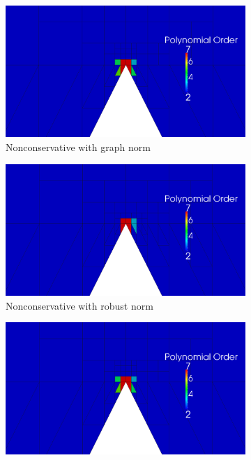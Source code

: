 \documentclass[letterpaper]{article}
\begin{document}
\begin{figure}
\centering
\begin{subfigure}[t]{0.45\textwidth}
\centering
\includegraphics[width=\textwidth]{figs/Wedge/graph16nc_poly.png}
\caption{Nonconservative with graph norm}
\label{fig:wedgeGraph16nc_poly}
\end{subfigure}
\begin{subfigure}[t]{0.45\textwidth}
\centering
\includegraphics[width=\textwidth]{figs/Wedge/robust16nc_poly.png}
\caption{Nonconservative with robust norm}
\label{fig:wedgeRobust16nc_poly}
\end{subfigure}
\begin{subfigure}[t]{0.45\textwidth}
\centering
\includegraphics[width=\textwidth]{figs/Wedge/graph16c_poly.png}

\end{subfigure}
\end{figure}
\end{document}
